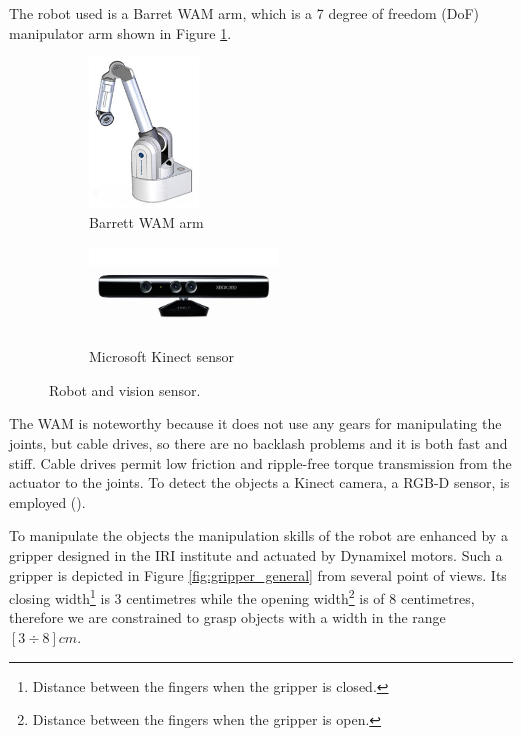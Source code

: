 The robot used is a Barret WAM arm, which is a 7 degree of freedom (DoF) manipulator arm shown in Figure \ref{fig:wam_1}. 
\begin{figure}[htp]
\centering
\begin{subfigure}[b]{0.45\textwidth}
\centering
\includegraphics[height=4cm]{Img/set_up/wam.jpg}
\caption{Barrett WAM arm}\label{fig:wam_1}
\end{subfigure}
\begin{subfigure}[b]{0.45\textwidth}
\centering
\includegraphics[width=5cm]{Img/set_up/Kinect.jpg}
\caption{Microsoft Kinect sensor}\label{fig:kinect}
\end{subfigure}
\caption{Robot and vision sensor.}
\end{figure}
The WAM is noteworthy because it does not use any gears for manipulating the joints, but cable drives, so there are no backlash problems and it is both fast and stiff. Cable drives permit low friction and ripple-free torque transmission from the actuator to the joints. 
To detect the objects a Kinect camera, a RGB-D sensor, is employed ().

To manipulate the objects the manipulation skills of the robot are enhanced by a gripper designed in the IRI institute and actuated by Dynamixel motors. Such a gripper is depicted in Figure \ref{fig:gripper_general} from several point of views. Its closing width\footnote{Distance between the fingers when the gripper is closed.} is $3$ centimetres while the opening width\footnote{Distance between the fingers when the gripper is open.} is of $8$ centimetres, therefore we are constrained to grasp objects with a width in the range $[3 \div 8]cm$.

